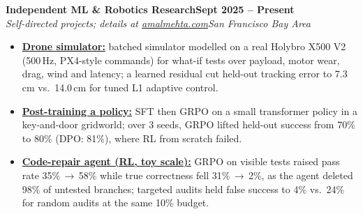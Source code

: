 \documentclass[10pt]{article}
\newcommand{\role}[4]{\par\vspace{3pt}\textbf{#1}\hfill\textbf{#2}\\\textit{#3}\hfill\textit{#4}}
\begin{document}
\role{Independent ML \& Robotics Research}{Sept 2025 -- Present}{Self-directed projects; details at \href{https://amalmehta.com/}{amalmehta.com}}{San Francisco Bay Area}
\begin{itemize}
\item \href{https://amalmehta.com/DroneAutonomy/}{\textbf{Drone simulator:}} batched simulator modelled on a real Holybro X500 V2 (500\,Hz, PX4-style commands) for what-if tests over payload, motor wear, drag, wind and latency; a learned residual cut held-out tracking error to 7.3\,cm vs.\ 14.0\,cm for tuned L1 adaptive control.
\item \href{https://github.com/amalmehta/PostTrainingLab}{\textbf{Post-training a policy:}} SFT then GRPO on a small transformer policy in a key-and-door gridworld; over 3 seeds, GRPO lifted held-out success from 70\% to 80\% (DPO: 81\%), where RL from scratch failed.
\item \href{https://amalmehta.com/long_term_horizon_planning/}{\textbf{Code-repair agent (RL, toy scale):}} GRPO on visible tests raised pass rate 35\%\,$\to$\,58\% while true correctness fell 31\%\,$\to$\,2\%, as the agent deleted 98\% of untested branches; targeted audits held false success to 4\% vs.\ 24\% for random audits at the same 10\% budget.
\end{itemize}
\end{document}
